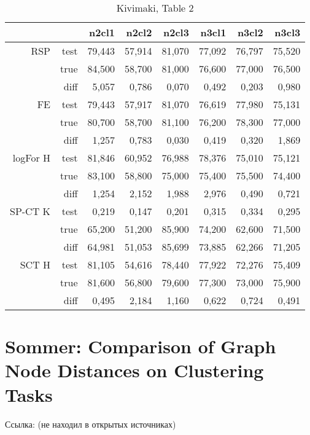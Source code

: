 \documentclass{article}
\begin{document}
\begin{table}[H]
\centering
\caption{Kivimaki, Table 2}
\label{my-label}
\begin{tabular}{rr|rrrrrr}
         &      & n2cl1  & n2cl2  & n2cl3  & n3cl1  & n3cl2  & n3cl3 \\
         \hline
RSP      & test & 79,443 & 57,914 & 81,070 & 77,092 & 76,797 & 75,520 \\
         & true & 84,500 & 58,700 & 81,000 & 76,600 & 77,000 & 76,500 \\
         & diff & 5,057  & 0,786  & 0,070  & 0,492  & 0,203  & 0,980  \\
         \cline{2-8}
FE       & test & 79,443 & 57,917 & 81,070 & 76,619 & 77,980 & 75,131 \\
         & true & 80,700 & 58,700 & 81,100 & 76,200 & 78,300 & 77,000 \\
         & diff & 1,257  & 0,783  & 0,030  & 0,419  & 0,320  & 1,869  \\
         \cline{2-8}
logFor H & test & 81,846 & 60,952 & 76,988 & 78,376 & 75,010 & 75,121 \\
         & true & 83,100 & 58,800 & 75,000 & 75,400 & 75,500 & 74,400 \\
         & diff & 1,254  & 2,152  & 1,988  & 2,976  & 0,490  & 0,721  \\
         \cline{2-8}
SP-CT K  & test & 0,219  & 0,147  & 0,201  & 0,315  & 0,334  & 0,295  \\
         & true & 65,200 & 51,200 & 85,900 & 74,200 & 62,600 & 71,500 \\
         & diff & \cellcolor{red!25} 64,981 & \cellcolor{red!25} 51,053 & \cellcolor{red!25} 85,699 &
                  \cellcolor{red!25} 73,885 & \cellcolor{red!25} 62,266 & \cellcolor{red!25} 71,205 \\
         \cline{2-8}
SCT H    & test & 81,105 & 54,616 & 78,440 & 77,922 & 72,276 & 75,409 \\
         & true & 81,600 & 56,800 & 79,600 & 77,300 & 73,000 & 75,900 \\
         & diff & 0,495  & 2,184  & 1,160  & 0,622  & 0,724  & 0,491  
\end{tabular}
\end{table}


\section{Sommer: Comparison of Graph Node Distances on Clustering Tasks}
Ссылка: (не находил в открытых источниках)
\end{document}
